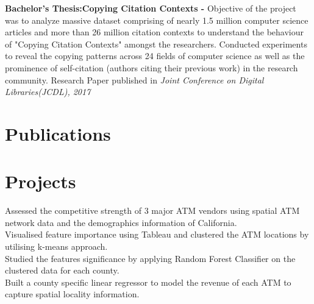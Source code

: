\documentclass[11pt,a4paper,sans]{moderncv}        %
\begin{document}
{\textbf{Bachelor's Thesis:Copying Citation Contexts -}  Objective of the project was to analyze massive dataset comprising of nearly 1.5 million computer science articles and more than 26 million citation contexts to understand the behaviour of "Copying Citation Contexts" amongst the researchers. Conducted experiments to reveal the copying patterns across 24 fields of computer science as well as the prominence of self-citation (authors citing their previous work) in the research community. Research Paper published in \textit{Joint Conference on Digital Libraries(JCDL), 2017}\\
}

\section{Publications}



\section{Projects}
{Assessed the competitive strength of 3 major ATM vendors using spatial ATM network data and the demographics information of California. \\
Visualised feature importance using Tableau and clustered the ATM locations by utilising k-means approach. \\
Studied the features significance by applying Random Forest Classifier on the clustered data for each county. \\
Built a county specific linear regressor to model the revenue of each ATM to capture spatial locality information. \\}
\end{document}
